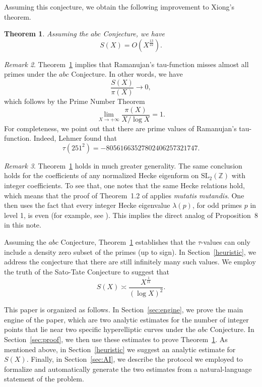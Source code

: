 \documentclass[12pt]{amsart}
\newtheorem{theorem}{Theorem}
\theoremstyle{remark}
\newtheorem{remark}[theorem]{Remark}
\numberwithin{equation}{section}
\begin{document}
Assuming this conjecture, we obtain the following improvement to Xiong's theorem.

\begin{theorem}\label{thm:main}
Assuming the $abc$ Conjecture, we have
$$
S(X) = O(X^{\frac{13}{22}}).
$$
\end{theorem}

\begin{remark} Theorem~\ref{thm:main} implies that
 Ramanujan's tau-function misses almost all primes under the $abc$ Conjecture.
 In other words, we have
\[
\frac{S(X)}{\pi(X)}\longrightarrow 0,
\]
which follows by the Prime Number Theorem
$$
\lim_{X\rightarrow +\infty}\frac{\pi(X)}{X/\log X}=1.
$$
For completeness, we point out that there are prime values of Ramanujan's tau-function.
Indeed, Lehmer \cite{Lehmer1965} found that
$$
\tau(251^2)= -80561663527802406257321747.
$$
\end{remark}

\begin{remark}
Theorem~\ref{thm:main} holds in much greater generality.
The same conclusion holds for the coefficients of any normalized Hecke eigenform
on $\mathrm{SL}_2(\mathbb{Z})$ with integer coefficients.
To see that, one notes that the same Hecke relations hold, which means that the proof of Theorem~1.2 of \cite{Xiong2025} applies {\it mutatis mutandis}.
One then uses the fact that every integer Hecke eigenvalue $\lambda(p)$, for odd primes $p$ in level 1, is even (for example, see \cite{Hatada}). This implies the direct analog of Proposition~8 in this note.
\end{remark}

Assuming the $abc$ Conjecture, Theorem~\ref{thm:main} establishes that the $\tau$-values can only include a density zero subset of the primes (up to sign). In Section~\ref{heuristic}, we address the conjecture that there are still infinitely many such values.
We employ the truth of the Sato-Tate Conjecture to suggest that
\[
S(X)\asymp \frac{X^{\frac{1}{11}}}{(\log X)^2}.
\]

This paper is organized as follows. In Section~\ref{sec:engine}, we prove the main engine of the paper, which are two analytic estimates for the number of integer points that lie near two specific hyperelliptic curves under the $abc$ Conjecture. In Section~\ref{sec:proof},  we then use these estimates to prove Theorem~\ref{thm:main}. As mentioned above, in Section~\ref{heuristic} we suggest an analytic estimate for $S(X)$. Finally, in Section~\ref{sec:AI}, we describe the protocol we employed to formalize and automatically generate the two estimates from a natural-language statement of the problem.
\end{document}

